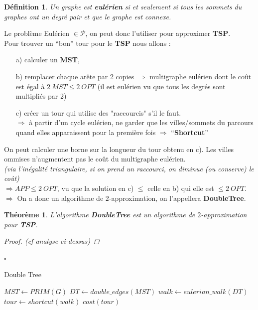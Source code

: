 \documentclass[12pt]{article}
\newcommand{\titre}[1]{\textcolor{title}{#1}}
\newcommand{\cqfd}{\begin{flushright}$\square$\end{flushright}}
\newtheorem{de}{D\'efinition}[section]
\newtheorem{thm}{Th\'eor\`eme}[section]
\newtheorem{proof}{Preuve}[section]
\begin{document}
\begin{de}
Un graphe est \textbf{eulérien} si et seulement si tous les sommets du graphes ont un degré pair et que le graphe est connexe.
\end{de}

Le problème Eulérien $\in \mathcal{P}$, on peut donc l'utiliser pour approximer \textbf{\titre{TSP}}.\\
Pour trouver un ``bon'' tour pour le \textbf{\titre{TSP}} nous allons :
\begin{enumerate}
\item[a)] calculer un \textbf{\titre{MST}},
\item[b)] remplacer chaque arête par 2 copies $\Rightarrow$ multigraphe eulérien dont le coût est égal à $2\ MST\leq 2\ OPT$
(il est eulérien vu que tous les degrés sont multipliés par 2)
\item[c)] créer un tour qui utilise des "raccourcis" s'il le faut. \\
$\Rightarrow$ à partir d'un cycle eulérien, ne garder que les villes/sommets du parcours quand elles apparaissent pour la première fois
$\Rightarrow$ ``\textbf{Shortcut}''\\
\end{enumerate}
On peut calculer une borne sur la longueur du tour obtenu en c). Les villes ommises n'augmentent pas le coût du multigraphe eulérien. \\
\textit{(via l'inégalité triangulaire, si on prend un raccourci, on diminue (ou conserve) le coût)} \\
$\Rightarrow APP \leq 2\ OPT$, vu que la solution en c) $\leq$ celle en b) qui elle est $\leq 2\ OPT$. \\
$\Longrightarrow$ On a donc un algorithme de $2$-approximation, on l'appellera \textbf{DoubleTree}.

\begin{thm}
L'algorithme \textbf{DoubleTree} est un algorithme de $2$-approximation pour \textbf{\titre{TSP}}.
\begin{proof} (cf analyse ci-dessus)
\end{proof}
\cqfd
\end{thm}

\begin{algorithm}[h!]
\caption{Double Tree}
\begin{algorithmic}[1]
\STATE $MST\leftarrow PRIM(G)$
\STATE $DT \leftarrow double\_edges(MST)$
\STATE $walk \leftarrow eulerian\_walk(DT)$
\STATE $tour \leftarrow shortcut(walk)$
\RETURN $cost(tour)$
\end{algorithmic}
\end{algorithm}
\end{document}
